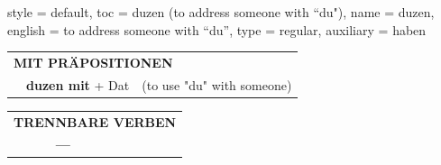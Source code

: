 \begin{verbentry}{
  style = {default},
  toc = {duzen (to address someone with ``du")},
  name = {duzen},
  english = {to address someone with \enquote{du}},
  type = {regular},
  auxiliary = {haben}
}
\vspace{10pt}

\begin{tabular}{lll}
\multicolumn{3}{l}{\textbf{MIT PRÄPOSITIONEN}}\\
& \textbf{duzen mit} + Dat & (to use "du" with someone)\\
\end{tabular}
\hfill
\begin{tabular}{lll}
\multicolumn{3}{l}{\textbf{TRENNBARE VERBEN}}\\
& \textbf{---} & \\
\end{tabular}
\vspace{-5pt}
\end{verbentry}
